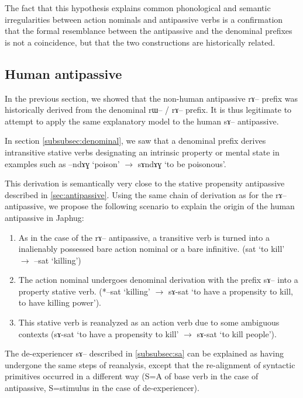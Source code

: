 \documentclass[oldfontcommands,oneside,a4paper,11pt]{article}
\newcommand{\ipa}[1]{{\phon \mbox{#1}}} %
\begin{document}
The fact that this hypothesis explains common phonological and semantic irregularities between action nominals and antipassive verbs is a  confirmation that the formal resemblance between the antipassive and the denominal prefixes is not a coincidence, but that the two constructions are historically related.


\subsection{Human antipassive} \label{subsec:human}

In the previous section, we   showed that the non-human antipassive \ipa{rɤ}-- prefix was historically derived from the denominal \ipa{rɯ}-- / \ipa{rɤ}-- prefix. It is thus  legitimate to attempt to apply the same explanatory model to the human \ipa{sɤ}-- antipassive.

In section \ref{subsubsec:denominal}, we saw that a denominal prefix  derives intransitive stative verbs designating an intrinsic property or mental state in examples such as \ipa{--ndɤɣ} `poison' $\rightarrow$ \ipa{sɤndɤɣ} `to be poisonous'.


This derivation is semantically very close to the stative propensity antipassive described in \ref{sec:antipassive}. Using the same chain of derivation as for the \ipa{rɤ}-- antipassive, we propose the following scenario to explain the origin of the human antipassive in Japhug:
\begin{enumerate}
\item As in the case of the \ipa{rɤ}-- antipassive, a transitive verb is turned into a inalienably possessed bare action nominal or a bare infinitive. (\ipa{sat} `to kill' $\rightarrow$ \ipa{--sat} `killing')
\item The action nominal undergoes denominal derivation with the prefix \ipa{sɤ}-- into a property stative verb. (*\ipa{--sat} `killing' $\rightarrow$ \ipa{sɤ-sat} `to have a propensity to kill, to have killing power').
\item This stative verb is reanalyzed as an action verb due to some ambiguous contexts (\ipa{sɤ-sat} `to have a propensity to kill'  $\rightarrow$ \ipa{sɤ-sat}  `to kill people').
\end{enumerate}
The de-experiencer \ipa{sɤ}-- described in \ref{subsubsec:sa} can be explained as having undergone the same steps of reanalysis, except that the re-alignment of syntactic primitives occurred in a different way (S=A of base verb in the case of antipassive, S=stimulus in the case of de-experiencer).
\end{document}
